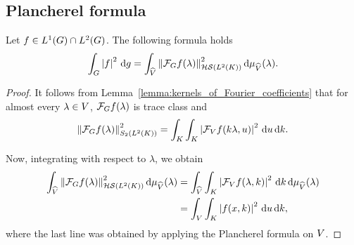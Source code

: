 \subsection{Plancherel formula}

\begin{proposition}
\label{proposition:Plancherel_formula}
    Let $f \in \Lebesgue{1}{\Group} \cap \Lebesgue{2}{\Group}$.
    The following formula holds
    \begin{align}
        \int_G \abs{f}^2 \dd g = \int_\dualGroup{\VectorSpace} \norm[\HilbertSchmidt{\Lebesgue{2}{\CompactGroup}}]{\Fourier{f}(\lambda)}^2 \dd \Plancherel{\VectorSpace}(\lambda).
        \label{proposition:Plancherel_formula:formula}
    \end{align}
\end{proposition}
\begin{proof}
    It follows from Lemma~\ref{lemma:kernels_of_Fourier_coefficients} that for almost every $\lambda \in \VectorSpace$,
    $\Fourier f(\lambda)$ is trace class and
    \begin{align*}
        \norm[\SchattenClasses{2}{\Lebesgue{2}\CompactGroup}]{\Fourier f(\lambda)}^2
        = \int_\CompactGroup \int_\CompactGroup \abs{\Fourier[\VectorSpace] f(k \lambda, u)}^2 \dd u \dd k.
    \end{align*}

    Now, integrating with respect to $\lambda$,
    we obtain
    \begin{align*}
        \int_\dualGroup{\VectorSpace} \norm[\HilbertSchmidt{\Lebesgue{2}{\CompactGroup}}]{\Fourier{f}(\lambda)}^2 \dd \Plancherel{\VectorSpace}(\lambda)
        &= \int_\dualGroup{\VectorSpace} \int_\CompactGroup \abs{\Fourier[\VectorSpace]{f}(\lambda, k)}^2 \dd k \dd \Plancherel{\VectorSpace}(\lambda)\\
        &= \int_\VectorSpace \int_\CompactGroup \abs{f(x, k)}^2 \dd u \dd k,
    \end{align*}
    where the last line was obtained by applying the Plancherel formula on $\VectorSpace$.
\end{proof}

